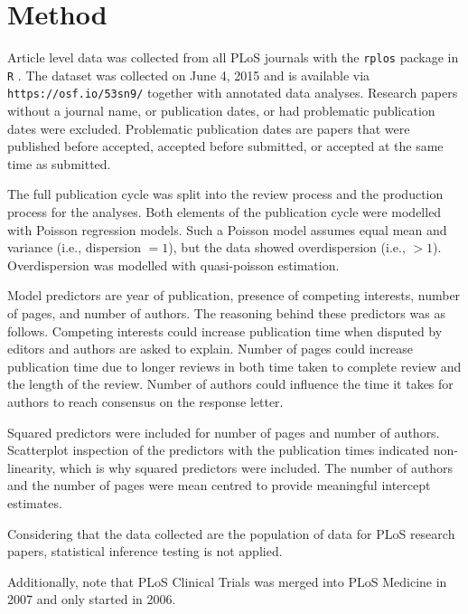 \section*{Method}
Article level data was collected from all PLoS journals with the \texttt{rplos} package \cite[v0.4.7][]{rplos} in \texttt{R} \cite[v3.2.0][]{rcran}. The dataset was collected on June 4, 2015 and is available via \texttt{https://osf.io/53sn9/} together with annotated data analyses. Research papers without a journal name, or publication dates, or had problematic publication dates were excluded. Problematic publication dates are papers that were published before accepted, accepted before submitted, or accepted at the same time as submitted.

The full publication cycle was split into the review process and the production process for the analyses. Both elements of the publication cycle were modelled with Poisson regression models. Such a Poisson model assumes equal mean and variance (i.e., dispersion $=1$), but the data showed overdispersion (i.e., $>1$). Overdispersion was modelled with quasi-poisson estimation.

Model predictors are year of publication, presence of competing interests, number of pages, and number of authors. The reasoning behind these predictors was as follows. Competing interests could increase publication time when disputed by editors and authors are asked to explain. Number of pages could increase publication time due to longer reviews in both time taken to complete review and the length of the review. Number of authors could influence the time it takes for authors to reach consensus on the response letter. 

Squared predictors were included for number of pages and number of authors. Scatterplot inspection of the predictors with the publication times indicated non-linearity, which is why squared predictors were included. The number of authors and the number of pages were mean centred to provide meaningful intercept estimates.

Considering that the data collected are the population of data for PLoS research papers, statistical inference testing is not applied.

Additionally, note that PLoS Clinical Trials was merged into PLoS Medicine in 2007 and only started in 2006.